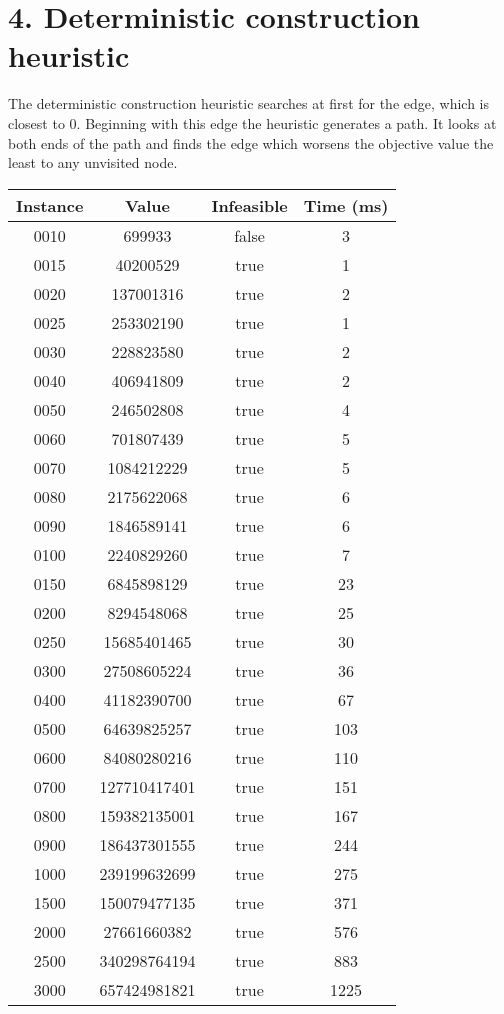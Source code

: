 \section*{4. Deterministic construction heuristic}
The deterministic construction heuristic searches at first for the edge, which is closest to 0. Beginning with this edge the heuristic generates a path. It looks at both ends of the path and finds the edge which worsens the objective value the least to any unvisited node.

\begin{center}
	\begin{tabular}{||c | c | c | c||} 
		\hline
		Instance  & Value & Infeasible & Time (ms) \\
		\hline\hline
0010 & 699933 & false & 3 \\
0015 & 40200529 & true & 1 \\
0020 & 137001316 & true & 2 \\
0025 & 253302190 & true & 1 \\
0030 & 228823580 & true & 2 \\
0040 & 406941809 & true & 2 \\
0050 & 246502808 & true & 4 \\
0060 & 701807439 & true & 5 \\
0070 & 1084212229 & true & 5 \\
0080 & 2175622068 & true & 6 \\
0090 & 1846589141 & true & 6 \\
0100 & 2240829260 & true & 7 \\
0150 & 6845898129 & true & 23 \\
0200 & 8294548068 & true & 25 \\
0250 & 15685401465 & true & 30 \\
0300 & 27508605224 & true & 36 \\
0400 & 41182390700 & true & 67 \\
0500 & 64639825257 & true & 103 \\
0600 & 84080280216 & true & 110 \\
0700 & 127710417401 & true & 151 \\
0800 & 159382135001 & true & 167 \\
0900 & 186437301555 & true & 244 \\
1000 & 239199632699 & true & 275 \\
1500 & 150079477135 & true & 371 \\
2000 & 27661660382 & true & 576 \\
2500 & 340298764194 & true & 883 \\
3000 & 657424981821 & true & 1225 \\
		\hline
	\end{tabular}
\end{center}